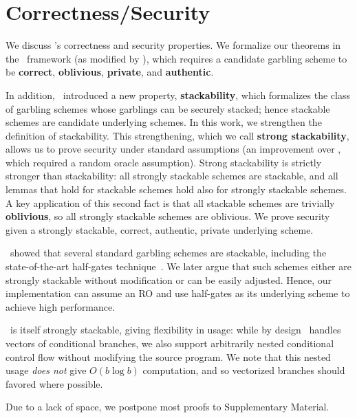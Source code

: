 \section{\ourschemelong Correctness/Security}\label{sec:proof}

We discuss \ourschemelong's correctness and security properties.
We formalize our theorems in the~\cite{CCS:BelHoaRog12} framework (as
modified by \HK),
which requires a candidate garbling scheme to be \textbf{correct},
\textbf{oblivious}, \textbf{private}, and \textbf{authentic}.

In addition, \HK\ introduced a new property, \textbf{stackability}, which
formalizes the class of garbling schemes whose garblings can be
securely stacked; hence stackable schemes are candidate underlying
schemes.
%
In this work, we strengthen the definition of stackability.  This
strengthening, which we call \textbf{strong stackability}, allows us to
prove security under standard assumptions (an improvement over \HK,
which required a random oracle assumption).
Strong stackability is strictly stronger than stackability: all
strongly
stackable schemes are stackable,
and all lemmas that hold for stackable schemes hold also for strongly
stackable schemes.
A key application of this second fact is that all stackable schemes
are trivially \textbf{oblivious}, so all strongly stackable schemes are
oblivious.
We prove security given a strongly stackable, correct, authentic,
private underlying scheme.

\HK\ showed that several standard garbling schemes are stackable, including
the state-of-the-art half-gates technique~\cite{EC:ZahRosEva15}.
We later argue that such schemes either are strongly stackable without
modification or can be easily adjusted.
Hence, our implementation can assume an RO and use half-gates as its underlying
scheme to achieve high performance.

\ourschemelong\ is itself strongly stackable, giving
flexibility in usage: while by design \ourschemelong\ handles vectors
of conditional branches, we also support arbitrarily nested
conditional control flow without modifying the source program.
%
We note that this nested usage \emph{does not} give $O(b\log b)$
computation, and so vectorized branches should favored where possible.

Due to a lack of space, we postpone most proofs to Supplementary
Material.



